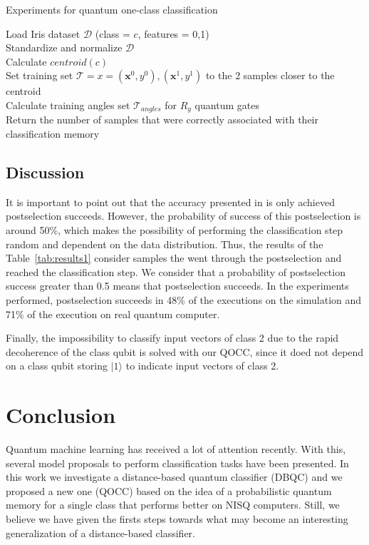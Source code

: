 \documentclass{esannV2}
\begin{document}
\begin{algorithm}[ht]
\caption{Experiments for quantum one-class classification}
\label{algo:exp}
Load Iris dataset $\mathcal{D}$ (class = $c$, features = {0,1})\\
Standardize and normalize $\mathcal{D}$\\
Calculate $centroid(c)$\\
Set training set $\mathcal{T}={x} = (\textbf{x}^{0},y^{0}), (\textbf{x}^{1},y^{1})$ to the 2 samples closer to the centroid\\
Calculate training angles set $\mathcal{T}_{angles}$ for $R_{y}$ quantum gates\\
Return the number of samples that were correctly associated with their classification memory
\end{algorithm}

\subsection{Discussion}

It is important to point out that the accuracy presented in \cite{schuld2017implementing} is only achieved postselection succeeds. However, the probability of success of this postselection is around 50\%, which makes the possibility of performing the classification step random and dependent on the data distribution. Thus, the results of the Table~\ref{tab:results1} consider samples the went through the postselection and reached the classification step. We consider that a probability of postselection success greater than 0.5 means that postselection succeeds. In the experiments performed, postselection succeeds in 48\% of the executions on the simulation and 71\% of the execution on real quantum computer.

Finally, the impossibility to classify input vectors of class 2 due to the rapid decoherence of the class qubit is solved with our QOCC, since it doed not depend on a class qubit storing $|1\rangle$ to indicate input vectors of class 2.

\section{Conclusion}

Quantum machine learning has received a lot of attention recently. With this, several model proposals to perform classification tasks have been presented. In this work we investigate a distance-based quantum classifier (DBQC) and we proposed a new one (QOCC) based on the idea of a probabilistic quantum memory for a single class that performs better on NISQ computers. Still, we believe we have given the firsts steps towards what may become an interesting generalization of a distance-based classifier.
\end{document}
